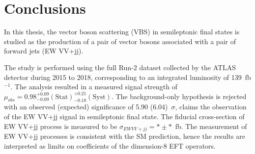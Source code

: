 \chapter{Conclusions}
\label{chap:conclusions}

In this thesis, the vector boson scattering (VBS) in semileptonic final states is studied as the production of a pair of vector bosons associated with a pair of forward jets (EW VV+jj). 

The study is performed using the full Run-2 dataset collected by the ATLAS detector during 2015 to 2018, corresponding to an integrated luminosity of 139~fb$^{-1}$.
The analysis resulted in a measured signal strength of $\mu_{obs} = 0.98^{+ 0.09}_{- 0.09}(\mathrm{Stat})^{+ 0.21}_{- 0.18}(\mathrm{Syst})$.
The background-only hypothesis is rejected with an observed (expected) significance of 5.90 (6.04)~$\sigma$, claims the observation of the EW VV+jj signal in semileptonic final state. 
The fiducial cross-section of EW VV+jj process is measured to be $\sigma_{EW VV+jj} = * \pm * $~fb.
The measurement of EW VV+jj processes is consistent with the SM prediction, hence the results are interpreted as limits on coefficients of the dimension-8 EFT operators.




